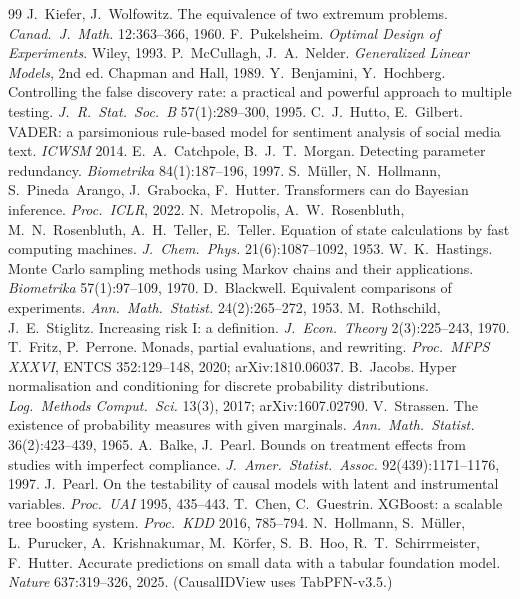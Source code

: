\documentclass[11pt]{article}
\theoremstyle{definition}
\theoremstyle{remark}
\begin{document}
\begin{thebibliography}{99}
 J.~Kiefer, J.~Wolfowitz. The equivalence of two extremum problems. \emph{Canad.\ J.\ Math.} 12:363--366, 1960.
 F.~Pukelsheim. \emph{Optimal Design of Experiments}. Wiley, 1993.
 P.~McCullagh, J.~A.~Nelder. \emph{Generalized Linear Models}, 2nd ed. Chapman and Hall, 1989.
 Y.~Benjamini, Y.~Hochberg. Controlling the false discovery rate: a practical and powerful approach to multiple testing. \emph{J.\ R.\ Stat.\ Soc.\ B} 57(1):289--300, 1995.
 C.~J.~Hutto, E.~Gilbert. VADER: a parsimonious rule-based model for sentiment analysis of social media text. \emph{ICWSM} 2014.
 E.~A.~Catchpole, B.~J.~T.~Morgan. Detecting parameter redundancy. \emph{Biometrika} 84(1):187--196, 1997.
 S.~M\"uller, N.~Hollmann, S.~Pineda~Arango, J.~Grabocka, F.~Hutter. Transformers can do Bayesian inference. \emph{Proc.\ ICLR}, 2022.
 N.~Metropolis, A.~W.~Rosenbluth, M.~N.~Rosenbluth, A.~H.~Teller, E.~Teller. Equation of state calculations by fast computing machines. \emph{J.\ Chem.\ Phys.} 21(6):1087--1092, 1953.
 W.~K.~Hastings. Monte Carlo sampling methods using Markov chains and their applications. \emph{Biometrika} 57(1):97--109, 1970.
 D.~Blackwell. Equivalent comparisons of experiments. \emph{Ann.\ Math.\ Statist.} 24(2):265--272, 1953.
 M.~Rothschild, J.~E.~Stiglitz. Increasing risk I: a definition. \emph{J.\ Econ.\ Theory} 2(3):225--243, 1970.
 T.~Fritz, P.~Perrone. Monads, partial evaluations, and rewriting. \emph{Proc.\ MFPS XXXVI}, ENTCS 352:129--148, 2020; arXiv:1810.06037.
 B.~Jacobs. Hyper normalisation and conditioning for discrete probability distributions. \emph{Log.\ Methods Comput.\ Sci.} 13(3), 2017; arXiv:1607.02790.
 V.~Strassen. The existence of probability measures with given marginals. \emph{Ann.\ Math.\ Statist.} 36(2):423--439, 1965.
 A.~Balke, J.~Pearl. Bounds on treatment effects from studies with imperfect compliance. \emph{J.\ Amer.\ Statist.\ Assoc.} 92(439):1171--1176, 1997.
 J.~Pearl. On the testability of causal models with latent and instrumental variables. \emph{Proc.\ UAI} 1995, 435--443.
 T.~Chen, C.~Guestrin. XGBoost: a scalable tree boosting system. \emph{Proc.\ KDD} 2016, 785--794.
 N.~Hollmann, S.~M\"uller, L.~Purucker, A.~Krishnakumar, M.~K\"orfer, S.~B.~Hoo, R.~T.~Schirrmeister, F.~Hutter. Accurate predictions on small data with a tabular foundation model. \emph{Nature} 637:319--326, 2025. (CausalIDView uses TabPFN-v3.5.)

\end{thebibliography}
\end{document}
